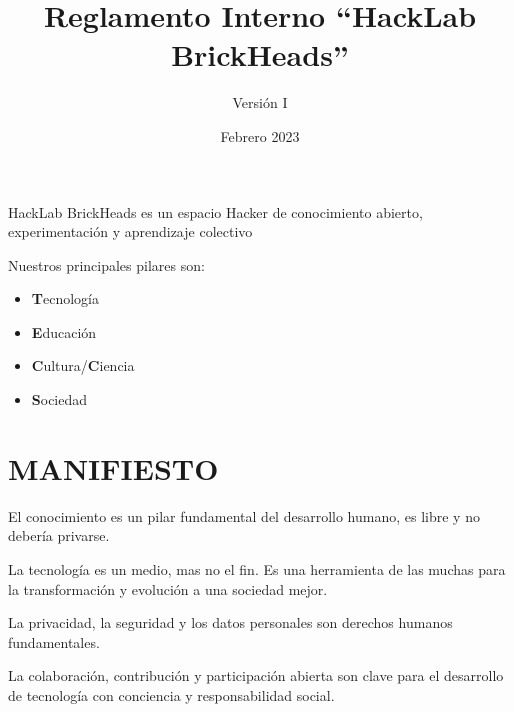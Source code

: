 \documentclass[12pt, letterpaper]{article}
\title{Reglamento Interno ``HackLab BrickHeads''}
\author{Versión I}
\date{Febrero 2023}
\begin{document}
    \maketitle

    \begin{center}
        HackLab BrickHeads es un espacio Hacker de conocimiento abierto, 
        experimentación y aprendizaje colectivo
    \end{center}

    Nuestros principales pilares son:
    \begin{itemize}
        \item \textbf{T}ecnología
        \item \textbf{E}ducación
        \item \textbf{C}ultura/\textbf{C}iencia
        \item \textbf{S}ociedad
    \end{itemize}

\section{MANIFIESTO}
    El conocimiento es un pilar fundamental del desarrollo humano, es libre y no
    debería privarse.

    La tecnología es un medio, mas no el fin. Es una herramienta de las muchas 
    para la transformación y evolución a una sociedad mejor.

    La privacidad, la seguridad y los datos personales son derechos humanos
    fundamentales.

    La colaboración, contribución y participación abierta son clave para el
    desarrollo de tecnología con conciencia y responsabilidad social.
\end{document}
